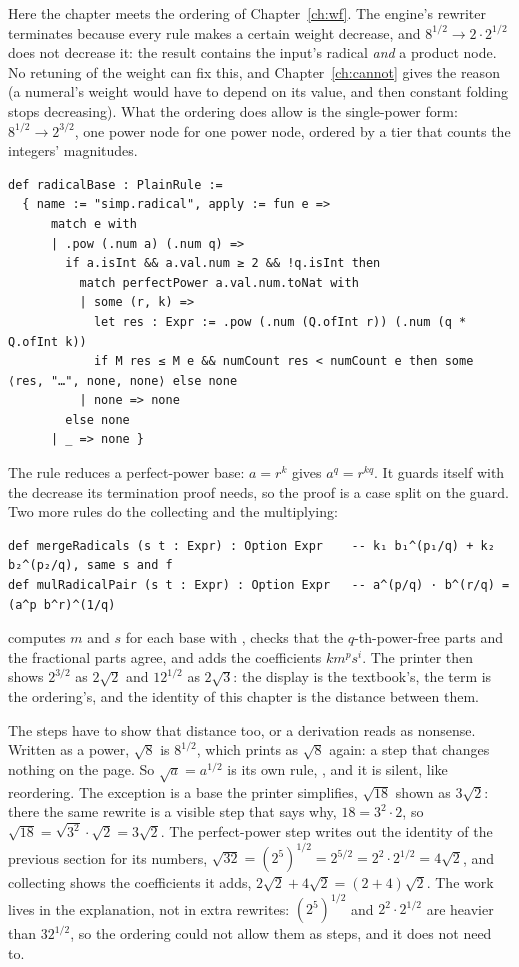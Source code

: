 Here the chapter meets the ordering of Chapter~\ref{ch:wf}. The engine's rewriter terminates
because every rule makes a certain weight decrease, and $8^{1/2} \to 2 \cdot 2^{1/2}$ does not
decrease it: the result contains the input's radical \emph{and} a product node. No retuning of
the weight can fix this, and Chapter~\ref{ch:cannot} gives the reason (a numeral's weight
would have to depend on its value, and then constant folding stops decreasing). What the ordering
does allow is the single-power form: $8^{1/2} \to 2^{3/2}$, one power node for one power node,
ordered by a tier that counts the integers' magnitudes.

\begin{verbatim}
def radicalBase : PlainRule :=
  { name := "simp.radical", apply := fun e =>
      match e with
      | .pow (.num a) (.num q) =>
        if a.isInt && a.val.num ≥ 2 && !q.isInt then
          match perfectPower a.val.num.toNat with
          | some (r, k) =>
            let res : Expr := .pow (.num (Q.ofInt r)) (.num (q * Q.ofInt k))
            if M res ≤ M e && numCount res < numCount e then some ⟨res, "…", none, none⟩ else none
          | none => none
        else none
      | _ => none }
\end{verbatim}

The rule reduces a perfect-power base: $a = r^k$ gives $a^{q} = r^{kq}$. It guards itself with the
decrease its termination proof needs, so the proof is a case split on the guard. Two more rules
do the collecting and the multiplying:

\begin{verbatim}
def mergeRadicals (s t : Expr) : Option Expr    -- k₁ b₁^(p₁/q) + k₂ b₂^(p₂/q), same s and f
def mulRadicalPair (s t : Expr) : Option Expr   -- a^(p/q) · b^(r/q) = (a^p b^r)^(1/q)
\end{verbatim}

 computes $m$ and $s$ for each base with , checks that the
$q$-th-power-free parts and the fractional parts agree, and adds the coefficients
$k m^p s^i$. The printer then shows $2^{3/2}$ as $2\sqrt 2$ and $12^{1/2}$ as $2\sqrt 3$: the
display is the textbook's, the term is the ordering's, and the identity of this chapter is the
distance between them.

The steps have to show that distance too, or a derivation reads as nonsense. Written as a power,
$\sqrt 8$ is $8^{1/2}$, which prints as $\sqrt 8$ again: a step that changes nothing on the page.
So $\sqrt a = a^{1/2}$ is its own rule, , and it is silent, like reordering. The
exception is a base the printer simplifies, $\sqrt{18}$ shown as $3\sqrt 2$: there the same
rewrite is a visible  step that says why, $18 = 3^2 \cdot 2$, so $\sqrt{18} =
\sqrt{3^2} \cdot \sqrt 2 = 3\sqrt 2$. The perfect-power step writes out the identity of the
previous section for its numbers, $\sqrt{32} = (2^5)^{1/2} = 2^{5/2} = 2^2 \cdot 2^{1/2} = 4\sqrt
2$, and collecting shows the coefficients it adds, $2\sqrt 2 + 4\sqrt 2 = (2 + 4)\sqrt 2$. The
work lives in the explanation, not in extra rewrites: $(2^5)^{1/2}$ and $2^2 \cdot 2^{1/2}$ are
heavier than $32^{1/2}$, so the ordering could not allow them as steps, and it does not need to.

